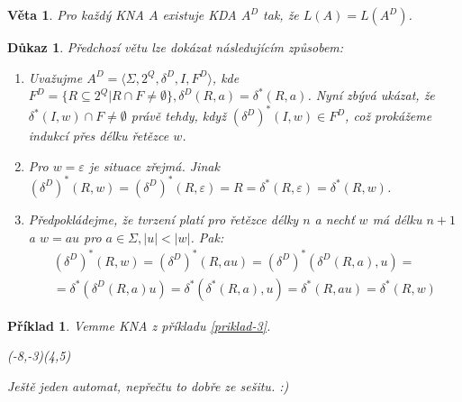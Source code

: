\documentclass[10pt, a4paper, titlepage]{article}
\theoremstyle{note}
\newtheorem{dukaz}{Důkaz}
\newtheorem{veta}{Věta}
\newtheorem{priklad}{Příklad}
\begin{document}
\begin{veta}
Pro každý KNA $A$ existuje KDA $A^{D}$ tak, že $L(A) = L(A^{D})$.
\end{veta}
\begin{dukaz}
Předchozí větu lze dokázat následujícím způsobem:

\begin{enumerate}
\item
Uvažujme $A^{D} = \langle \Sigma, 2^{Q}, \delta^{D}, I, F^{D} \rangle$, kde $F^{D} = \lbrace R \subseteq 2^{Q} | R \cap F \neq \emptyset \rbrace, \delta^{D}(R,a) = \delta^{*}(R,a)$.
Nyní zbývá ukázat, že $\delta^{*}(I,w) \cap F \neq \emptyset$ právě tehdy, když $(\delta^{D})^{*}(I,w) \in F^{D}$, což prokážeme indukcí přes délku řetězce $w$.

\item
Pro $w = \varepsilon$ je situace zřejmá. Jinak $(\delta^{D})^{*} (R,w) = (\delta^{D})^{*} (R, \varepsilon) = R = \delta^{*}(R, \varepsilon) = \delta^{*}(R,w)$.

\item
Předpokládejme, že tvrzení platí pro řetězce délky $n$ a nechť $w$ má délku $n+1$ a $w=au$ pro $a \in \Sigma, |u| < |w|$. Pak:
\begin{gather*}
(\delta^{D})^{*} (R,w) = (\delta^{D})^{*} (R, au) = (\delta^{D})^{*}(\delta^{D}(R,a),u) = \\
= \delta^{*}(\delta^{D}(R,a)u) = \delta^{*}(\delta^{*}(R,a),u) = \delta^{*}(R, au) = \delta^{*}(R,w)
\end{gather*}
\end{enumerate}
\end{dukaz}

\begin{priklad}
Vemme KNA z příkladu \ref{priklad-3}.

\begin{VCPicture}{(-8,-3)(4,5)}


\end{VCPicture}

Ještě jeden automat, nepřečtu to dobře ze sešitu. :)

\end{priklad}
\end{document}
